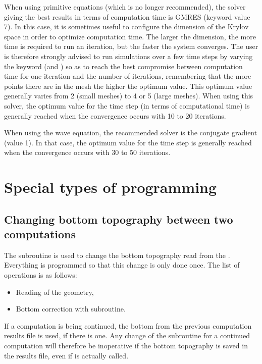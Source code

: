 When using primitive equations (which is no longer recommended), the solver
giving the best results in terms of computation time is GMRES (keyword value 7).
In this case, it is sometimes useful to configure the dimension of the Krylov
space in order to optimize computation time.
The larger the dimension, the more time is required to run an iteration,
but the faster the system converges.
The user is therefore strongly advised to run simulations over a few time steps
by varying the keyword 
(and ) so as to reach the best compromise between
computation time for one iteration and the number of iterations, remembering
that the more points there are in the mesh the higher the optimum value.
This optimum value generally varies from 2 (small meshes) to 4 or 5 (large
meshes).
When using this solver, the optimum value for the time step (in terms of
computational time) is generally reached when the convergence occurs with 10 to
20 iterations.

When using the wave equation, the recommended solver is the conjugate gradient
(value 1).
In that case, the optimum value for the time step is generally reached
when the convergence occurs with 30 to 50 iterations.


\section{Special types of programming}


\subsection{Changing bottom topography between two computations}

The  subroutine is used to change the bottom topography read
from the .
Everything is programmed so that this change is only done once.
The list of operations is as follows:
\begin{itemize}
\item Reading of the geometry,

\item Bottom correction with  subroutine.
\end{itemize}

If a computation is being continued, the bottom from the previous computation
results file is used, if there is one.
Any change of the  subroutine for a continued computation
will therefore be inoperative if the bottom topography is saved in the results
file, even if  is actually called.

